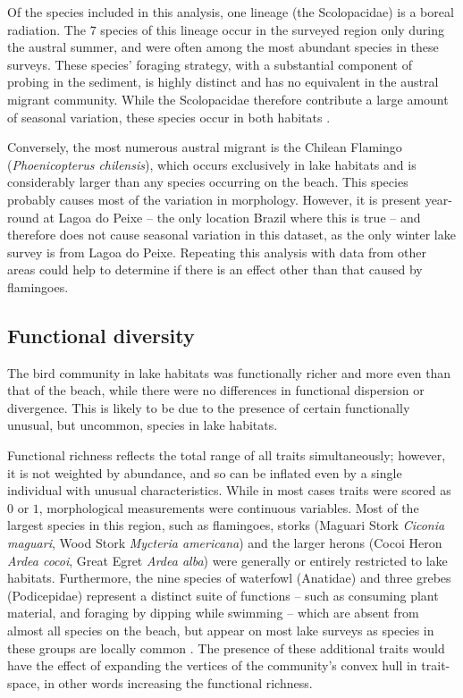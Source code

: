 \documentclass[12pt,a4paper]{book}
\begin{document}
Of the species included in this analysis, one lineage (the Scolopacidae) is a boreal radiation. The $7$ species of this lineage occur in the surveyed region only during the austral summer, and were often among the most abundant species in these surveys. These species' foraging strategy, with a substantial component of probing in the sediment, is highly distinct and has no equivalent in the austral migrant community. While the Scolopacidae therefore contribute a large amount of seasonal variation, these species occur in both habitats \citep{LaraResende1988}.

Conversely, the most numerous austral migrant is the Chilean Flamingo (\textit{Phoenicopterus chilensis}), which occurs exclusively in lake habitats and is considerably larger than any species occurring on the beach. This species probably causes most of the variation in morphology. However, it is present year-round at Lagoa do Peixe -- the only location Brazil where this is true \citep{Nascimento1995, vanPerlo2009} -- and therefore does not cause seasonal variation in this dataset, as the only winter lake survey is from Lagoa do Peixe. Repeating this analysis with data from other areas could help to determine if there is an effect other than that caused by flamingoes.

\subsection{Functional diversity}
The bird community in lake habitats was functionally richer and more even than that of the beach, while there were no differences in functional dispersion or divergence. This is likely to be due to the presence of certain functionally unusual, but uncommon, species in lake habitats. 

Functional richness reflects the total range of all traits simultaneously; however, it is not weighted by abundance, and so can be inflated even by a single individual with unusual characteristics. While in most cases traits were scored as $0$ or $1$, morphological measurements were continuous variables. Most of the largest species in this region, such as flamingoes, storks (Maguari Stork \textit{Ciconia maguari}, Wood Stork \textit{Mycteria americana}) and the larger herons (Cocoi Heron \textit{Ardea cocoi}, Great Egret \textit{Ardea alba}) were generally or entirely restricted to lake habitats. Furthermore, the nine species of waterfowl (Anatidae) and three grebes (Podicepidae) represent a distinct suite of functions -- such as consuming plant material, and foraging by dipping while swimming -- which are absent from almost all species on the beach, but appear on most lake surveys as species in these groups are locally common \citep[and pers. obs.]{Nascimento1995}. The presence of these additional traits would have the effect of expanding the vertices of the community's convex hull in trait-space, in other words increasing the functional richness.
\end{document}

